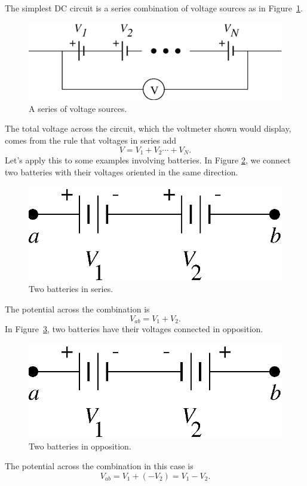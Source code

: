 The simplest DC circuit is a series combination of voltage sources as in 
Figure~\ref{fig:DC:voltseries}. 
\begin{figure}[htb]
\centering \epsfxsize=9cm \includegraphics[scale=0.6]{2_dc/voltseries.eps}
\caption{A series of voltage sources.}
\label{fig:DC:voltseries}
\end{figure}
The total voltage across the circuit, which the voltmeter shown would display, 
comes from the rule that voltages in series add
$$
V = V_1 + V_2 \cdots + V_N.
$$
Let's apply this to some examples involving batteries.  In Figure 
\ref{fig:DC:battalign}, we connect two batteries with their voltages oriented 
in the same direction.  
\begin{figure}[htb]
\centering \epsfxsize=5cm \includegraphics[scale=0.6]{2_dc/battalign.eps}
\caption{Two batteries in series.}
\label{fig:DC:battalign}
\end{figure}
The potential across the combination is
$$
V_{ab} = V_1 + V_2.
$$
In Figure~\ref{fig:DC:battopp}, two batteries have their voltages connected
in opposition.  
\begin{figure}[htb]
\centering \epsfxsize=5cm \includegraphics[scale=0.6]{2_dc/battopp.eps}
\caption{Two batteries in opposition.}
\label{fig:DC:battopp}
\end{figure}
The potential across the combination in this case is
$$
V_{ab} = V_1 + (-V_2)=V_1 - V_2.
$$


